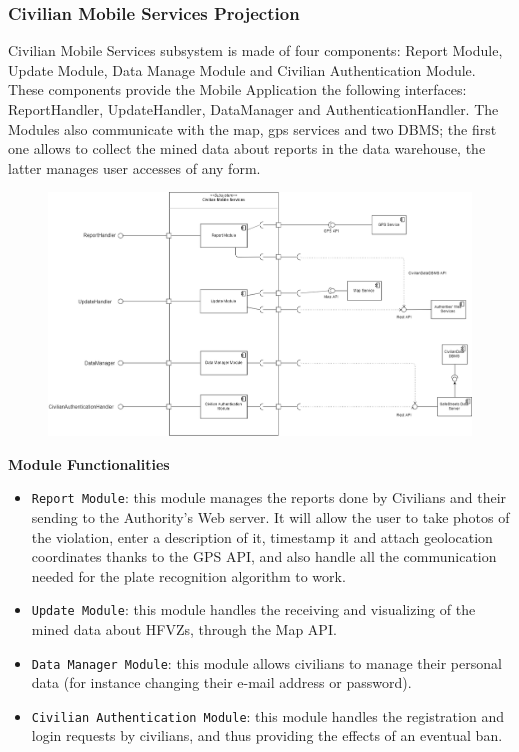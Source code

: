 \documentclass[12pt,a4paper]{article}
\begin{document}
\subsubsection{Civilian Mobile Services Projection}
Civilian Mobile Services subsystem is made of four components: Report Module, Update Module, Data Manage Module and Civilian Authentication Module.
These components provide the Mobile Application the following interfaces: ReportHandler, UpdateHandler, DataManager and AuthenticationHandler. The Modules also communicate with the map, gps services and two DBMS; the first one allows to collect the mined data about reports in the data warehouse, the latter manages user accesses of any form.
\begin{figure}[H]
				\centering
					\begin{adjustwidth}{-25mm}{-25mm}
					        \includegraphics[width=0.9\paperwidth]{Images/CivilianMobileServicesProjection}
					\end{adjustwidth}
			\end{figure}
\newpage
\textbf{Module Functionalities}
\begin{itemize}
	\item \texttt{Report Module}: this module manages the reports done by Civilians and their sending to the Authority's Web server. It will allow the user to take photos of the violation, enter a description of it, timestamp it and attach geolocation coordinates thanks to the GPS API, and also handle all the communication needed for the plate recognition algorithm to work.
	\item \texttt{Update Module}: this module handles the receiving and visualizing of the mined data about HFVZs, through the Map API.
	\item \texttt{Data Manager Module}: this module allows civilians to manage their personal data (for instance changing their e-mail address or password).
	\item \texttt{Civilian Authentication Module}: this module handles the registration and login requests by civilians, and thus providing the effects of an eventual ban.
\end{itemize}
\newpage
\end{document}
